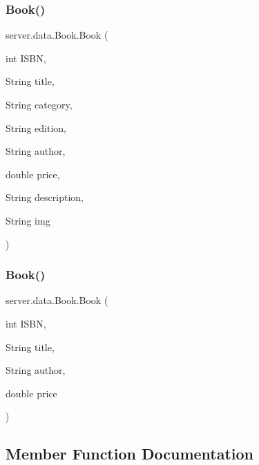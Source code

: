 \subsubsection{\texorpdfstring{Book()}{Book()}\hspace{0.1cm}{\footnotesize\ttfamily [1/2]}}
{\footnotesize\ttfamily server.\+data.\+Book.\+Book (\begin{DoxyParamCaption}\item[{int}]{I\+S\+BN,  }\item[{String}]{title,  }\item[{String}]{category,  }\item[{String}]{edition,  }\item[{String}]{author,  }\item[{double}]{price,  }\item[{String}]{description,  }\item[{String}]{img }\end{DoxyParamCaption})}

\mbox{\label{classserver_1_1data_1_1_book_a7cfac0c9e49e46d1a04746612ba1cb14}} 
\subsubsection{\texorpdfstring{Book()}{Book()}\hspace{0.1cm}{\footnotesize\ttfamily [2/2]}}
{\footnotesize\ttfamily server.\+data.\+Book.\+Book (\begin{DoxyParamCaption}\item[{int}]{I\+S\+BN,  }\item[{String}]{title,  }\item[{String}]{author,  }\item[{double}]{price }\end{DoxyParamCaption})}



\subsection{Member Function Documentation}
\mbox{\label{classserver_1_1data_1_1_book_a8c44fbc3a0d63d0726cb967a3f65203c}} 
